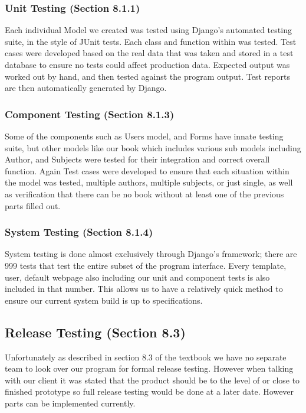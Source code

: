 \documentclass[11pt]{article}
\begin{document}
		\subsubsection{Unit Testing (Section 8.1.1)}

			Each individual Model we created was tested using Django's automated testing suite, in the style of JUnit tests. 
			Each class and function within was tested. 
			Test cases were developed based on the real data that was taken and stored in a test database to ensure no tests could affect production data. 
			Expected output was worked out by hand, and then tested against the program output. 
			Test reports are then automatically generated by Django. 

		\subsubsection{Component Testing (Section 8.1.3)}

			Some of the components such as Users model, and Forms have innate testing suite, but other models like our book which includes various sub models including Author, and Subjects were tested for their integration and correct overall function. 
			Again Test cases were developed to ensure that each situation within the model was tested, multiple authors, multiple subjects, or just single, as well as verification that there can be no book without at least one of the previous parts filled out.

		\subsubsection{System Testing (Section 8.1.4)}

			System testing is done almost exclusively through Django's framework; there are 999 tests that test the entire subset of the program interface. 
			Every template, user, default webpage also including our unit and component tests is also included in that number. 
			This allows us to have a relatively quick method to ensure our current system build is up to specifications.

	\subsection{Release Testing (Section 8.3)}

		Unfortunately as described in section 8.3 of the textbook we have no separate team to look over our program for formal release testing.
		However when talking with our client it was stated that the product should be to the level of or close to finished prototype so full release testing would be done at a later date. 
		However parts can be implemented currently. 
\end{document}
